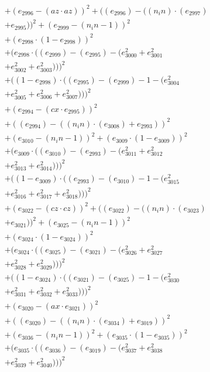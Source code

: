 \documentclass[10pt, a4paper]{article}
\begin{document}
\begin{small}
\begin{align*}
& + (e_{2996} - (az  \cdot  az))^{2} + ((e_{2996}) - ((n_in)  \cdot  (e_{2997}) \\
& + e_{2995}))^{2} + (e_{2999} - (n_in - 1))^{2} \\
& + (e_{2998}  \cdot  (1 - e_{2998}))^{2} \\
& + (e_{2998}  \cdot  ((e_{2999}) - (e_{2995}) - (e_{3000}^{2} + e_{3001}^{2} \\
& + e_{3002}^{2} + e_{3003}^{2})))^{2} \\
& + ((1 - e_{2998})  \cdot  ((e_{2995}) - (e_{2999}) - 1 - (e_{3004}^{2} \\
& + e_{3005}^{2} + e_{3006}^{2} + e_{3007}^{2})))^{2} \\
& + (e_{2994} - (cx  \cdot  e_{2995}))^{2} \\
& + ((e_{2994}) - ((n_in)  \cdot  (e_{3008}) + e_{2993}))^{2} \\
& + (e_{3010} - (n_in - 1))^{2} + (e_{3009}  \cdot  (1 - e_{3009}))^{2} \\
& + (e_{3009}  \cdot  ((e_{3010}) - (e_{2993}) - (e_{3011}^{2} + e_{3012}^{2} \\
& + e_{3013}^{2} + e_{3014}^{2})))^{2} \\
& + ((1 - e_{3009})  \cdot  ((e_{2993}) - (e_{3010}) - 1 - (e_{3015}^{2} \\
& + e_{3016}^{2} + e_{3017}^{2} + e_{3018}^{2})))^{2} \\
& + (e_{3022} - (cz  \cdot  cz))^{2} + ((e_{3022}) - ((n_in)  \cdot  (e_{3023}) \\
& + e_{3021}))^{2} + (e_{3025} - (n_in - 1))^{2} \\
& + (e_{3024}  \cdot  (1 - e_{3024}))^{2} \\
& + (e_{3024}  \cdot  ((e_{3025}) - (e_{3021}) - (e_{3026}^{2} + e_{3027}^{2} \\
& + e_{3028}^{2} + e_{3029}^{2})))^{2} \\
& + ((1 - e_{3024})  \cdot  ((e_{3021}) - (e_{3025}) - 1 - (e_{3030}^{2} \\
& + e_{3031}^{2} + e_{3032}^{2} + e_{3033}^{2})))^{2} \\
& + (e_{3020} - (ax  \cdot  e_{3021}))^{2} \\
& + ((e_{3020}) - ((n_in)  \cdot  (e_{3034}) + e_{3019}))^{2} \\
& + (e_{3036} - (n_in - 1))^{2} + (e_{3035}  \cdot  (1 - e_{3035}))^{2} \\
& + (e_{3035}  \cdot  ((e_{3036}) - (e_{3019}) - (e_{3037}^{2} + e_{3038}^{2} \\
& + e_{3039}^{2} + e_{3040}^{2})))^{2} \\

\end{align*}
\end{small}
\end{document}
